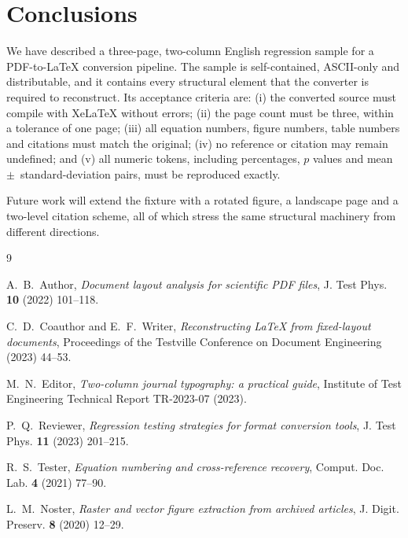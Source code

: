 \documentclass[10pt,twocolumn,a4paper]{article}
\begin{document}
\section{Conclusions}
\label{sec:conclusions}

We have described a three-page, two-column English regression sample for a
PDF-to-LaTeX conversion pipeline. The sample is self-contained, ASCII-only
and distributable, and it contains every structural element that the
converter is required to reconstruct. Its acceptance criteria are:
(i) the converted source must compile with XeLaTeX without errors;
(ii) the page count must be three, within a tolerance of one page;
(iii) all equation numbers, figure numbers, table numbers and citations
must match the original;
(iv) no reference or citation may remain undefined;
and (v) all numeric tokens, including percentages, $p$ values and
mean~$\pm$~standard-deviation pairs, must be reproduced exactly.

Future work will extend the fixture with a rotated figure, a landscape page
and a two-level citation scheme, all of which stress the same structural
machinery from different directions.

\begin{thebibliography}{9}
\footnotesize

A.~B.~Author, \emph{Document layout analysis for scientific PDF files},
J. Test Phys. \textbf{10} (2022) 101--118.

C.~D.~Coauthor and E.~F.~Writer, \emph{Reconstructing LaTeX from
fixed-layout documents}, Proceedings of the Testville Conference on
Document Engineering (2023) 44--53.

M.~N.~Editor, \emph{Two-column journal typography: a practical guide},
Institute of Test Engineering Technical Report TR-2023-07 (2023).

P.~Q.~Reviewer, \emph{Regression testing strategies for format conversion
tools}, J. Test Phys. \textbf{11} (2023) 201--215.

R.~S.~Tester, \emph{Equation numbering and cross-reference recovery},
Comput. Doc. Lab. \textbf{4} (2021) 77--90.

L.~M.~Noster, \emph{Raster and vector figure extraction from archived
articles}, J. Digit. Preserv. \textbf{8} (2020) 12--29.

\end{thebibliography}
\end{document}
